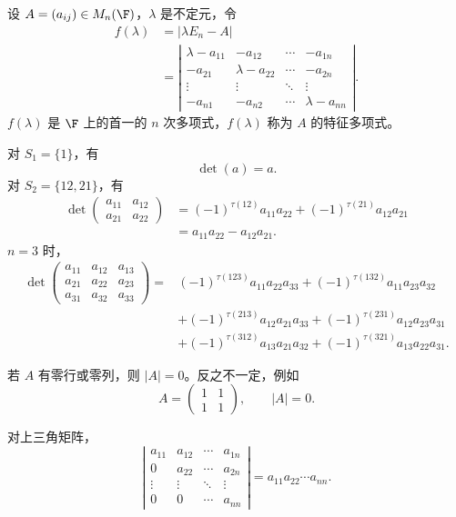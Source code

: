 \begin{example}
	设 $A=(a_{ij})\in M_n(\F)$，$\lambda$ 是不定元，令
	\[
	\begin{aligned}
		f(\lambda)
		&=|\lambda E_n-A|\\
		&=
		\left|
		\begin{matrix}
			\lambda-a_{11}&-a_{12}&\cdots&-a_{1n}\\
			-a_{21}&\lambda-a_{22}&\cdots&-a_{2n}\\
			\vdots&\vdots&\ddots&\vdots\\
			-a_{n1}&-a_{n2}&\cdots&\lambda-a_{nn}
		\end{matrix}
		\right|.
	\end{aligned}
	\]
	$f(\lambda)$ 是 $\F$ 上的首一的 $n$ 次多项式，$f(\lambda)$ 称为 $A$ 的特征多项式。
\end{example}

\begin{example}
	对 $S_1=\{1\}$，有
	\[
	\det(a)=a.
	\]
	对 $S_2=\{12,21\}$，有
	\[
	\begin{aligned}
		\det
		\begin{pmatrix}
			a_{11}&a_{12}\\
			a_{21}&a_{22}
		\end{pmatrix}
		&=(-1)^{\tau(12)}a_{11}a_{22}
		+(-1)^{\tau(21)}a_{12}a_{21}\\
		&=a_{11}a_{22}-a_{12}a_{21}.
	\end{aligned}
	\]
	$n=3$ 时，
	\[
	\begin{aligned}
		\det
		\begin{pmatrix}
			a_{11}&a_{12}&a_{13}\\
			a_{21}&a_{22}&a_{23}\\
			a_{31}&a_{32}&a_{33}
		\end{pmatrix}
		=&(-1)^{\tau(123)}a_{11}a_{22}a_{33}
		+(-1)^{\tau(132)}a_{11}a_{23}a_{32}\\
		&+(-1)^{\tau(213)}a_{12}a_{21}a_{33}
		+(-1)^{\tau(231)}a_{12}a_{23}a_{31}\\
		&+(-1)^{\tau(312)}a_{13}a_{21}a_{32}
		+(-1)^{\tau(321)}a_{13}a_{22}a_{31}.
	\end{aligned}
	\]
\end{example}


若 $A$ 有零行或零列，则 $|A|=0$。反之不一定，例如
\[
A=\begin{pmatrix}1&1\\1&1\end{pmatrix},
\qquad
|A|=0.
\]

对上三角矩阵，
\[
\left|
\begin{matrix}
	a_{11}&a_{12}&\cdots&a_{1n}\\
	0&a_{22}&\cdots&a_{2n}\\
	\vdots&\vdots&\ddots&\vdots\\
	0&0&\cdots&a_{nn}
\end{matrix}
\right|
=a_{11}a_{22}\cdots a_{nn}.
\]

